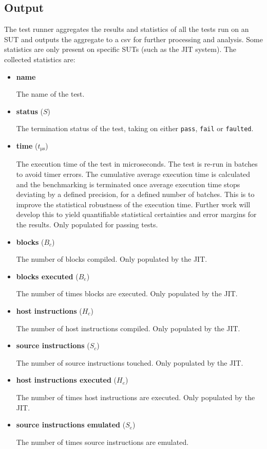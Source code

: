 \subsection{Output}

The test runner aggregates the results and statistics of all the tests run on an SUT and outputs the aggregate to a csv for further processing and analysis. Some statistics are only present on specific SUTs (such as the JIT system). The collected statistics are:

\begin{itemize}
    \item \textbf{name}
    
    The name of the test.

    \item \textbf{status} ($S$)
    
    The termination status of the test, taking on either \texttt{pass}, \texttt{fail} or \texttt{faulted}.

    \item \textbf{time} ($t_{\si{\micro\second}}$)
    
    The execution time of the test in microseconds. The test is re-run in batches to avoid timer errors. The cumulative average execution time is calculated and the benchmarking is terminated once average execution time stops deviating by a defined precision, for a defined number of batches. This is to improve the statistical robustness of the execution time. Further work will develop this to yield quantifiable statistical certainties and error margins for the results. Only populated for passing tests.

    \item \textbf{blocks} ($B_c$)
    
    The number of blocks compiled. Only populated by the JIT.

    \item \textbf{blocks executed} ($B_e$)
    
    The number of times blocks are executed. Only populated by the JIT.

    \item \textbf{host instructions} ($H_c$)
    
    The number of host instructions compiled. Only populated by the JIT.

    \item \textbf{source instructions} ($S_c$)
    
    The number of source instructions touched. Only populated by the JIT.

    \item \textbf{host instructions executed} ($H_e$)
    
    The number of times host instructions are executed. Only populated by the JIT.

    \item \textbf{source instructions emulated} ($S_e$)
    
    The number of times source instructions are emulated.
\end{itemize}

